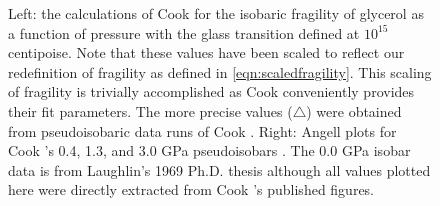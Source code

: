 \begin{figure}
{\begin{minipage}[t]{.46\textwidth}
			\end{minipage}%
		}
		
		\caption{Left: the calculations of Cook \etal for the isobaric fragility of glycerol as a function of pressure with the glass transition defined at $10^{15}$ centipoise. Note that these values have been scaled to reflect our redefinition of fragility as defined in \eqn\nolinebreak\ref{eqn:scaledfragility}. This scaling of fragility is trivially accomplished as Cook \etal conveniently provides their fit parameters. The more precise values ({\color{red}$\triangle$}) were obtained from pseudoisobaric data runs of Cook \etal. Right: Angell plots for Cook \etal's 0.4, 1.3, and 3.0 \si{\giga\pascal} pseudoisobars \protect\nolinebreak\cite{Cook2}. The 0.0 \si{\giga\pascal} isobar data is from Laughlin's 1969 Ph.D. thesis \protect\nolinebreak\cite{Laughlin} although all values plotted here were directly extracted from Cook \etal's published figures.}
		\label{figure:CookFrag}
	\end{figure}  
	
